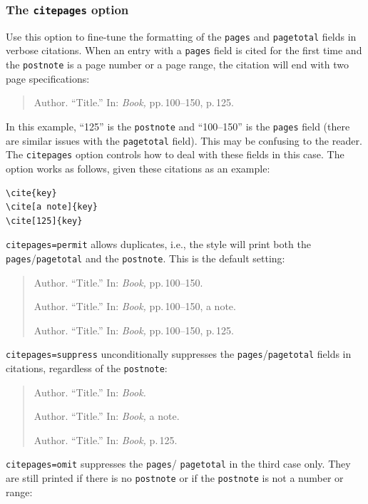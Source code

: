 \documentclass[a4paper]{article}
\begin{document}
\subsubsection*{The \texttt{citepages} option}

Use this option to fine-tune the formatting of the \texttt{pages}
and \texttt{pagetotal} fields in verbose citations. When an entry
with a \texttt{pages} field is cited for the first time and the
\texttt{postnote} is a page number or a page range, the citation
will end with two page specifications:

\begin{quote}
Author. \enquote{Title.} In: \emph{Book,} pp.\,100--150, p.\,125.
\end{quote}
%
In this example, \enquote{125} is the \texttt{postnote} and
\enquote{100--150} is the \texttt{pages} field (there are similar
issues with the \texttt{pagetotal} field). This may be confusing to
the reader. The \texttt{citepages} option controls how to deal with
these fields in this case. The option works as follows, given these
citations as an example:

\begin{verbatim}
\cite{key}
\cite[a note]{key}
\cite[125]{key}
\end{verbatim}
%
\texttt{citepages=permit} allows duplicates, i.e., the style will
print both the \texttt{pages}\slash \texttt{pagetotal} and the
\texttt{postnote}. This is the default setting:

\begin{quote}
Author. \enquote{Title.} In: \emph{Book,} pp.\,100--150.

Author. \enquote{Title.} In: \emph{Book,} pp.\,100--150, a note.

Author. \enquote{Title.} In: \emph{Book,} pp.\,100--150, p.\,125.
\end{quote}
%
\texttt{citepages=suppress} unconditionally suppresses the
\texttt{pages}\slash \texttt{pagetotal} fields in citations,
regardless of the \texttt{postnote}:

\begin{quote}
Author. \enquote{Title.} In: \emph{Book.}

Author. \enquote{Title.} In: \emph{Book,} a note.

Author. \enquote{Title.} In: \emph{Book,} p.\,125.
\end{quote}
%
\texttt{citepages=omit} suppresses the \texttt{pages}\slash
\texttt{pagetotal} in the third case only. They are still printed if
there is no \texttt{postnote} or if the \texttt{postnote} is not a
number or range:
\end{document}
